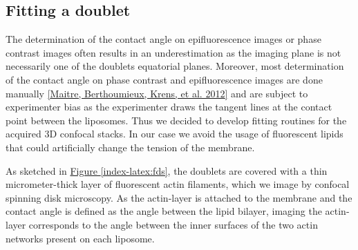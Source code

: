 \documentclass[A4paperpaper,11pt,english]{sphinxmanual}
\begin{document}
\subsection{Fitting a doublet}
\label{index-latex:fitting-a-doublet}
The determination of the contact angle on epifluorescence images or phase contrast
images often results in an underestimation as the imaging plane is not necessarily one of the doublets
equatorial planes. Moreover, most determination of the contact angle on phase
contrast and epifluorescence images are done manually {\hyperref[index-latex:maitre2012]{{[}Maitre, Berthoumieux, Krens,  et al.  2012{]}}} and
are subject to experimenter bias as the experimenter draws the tangent lines at the
contact point between the liposomes. Thus we decided to develop fitting routines for the acquired
3D confocal stacks. In our case we avoid the usage of
fluorescent lipids that could artificially change the tension of the membrane.

As sketched in \hyperref[index-latex:fds]{Figure  \ref*{index-latex:fds}}, the doublets are covered with a
thin micrometer-thick layer of fluorescent actin filaments, which we
image by confocal spinning disk microscopy. As the actin-layer is attached to the membrane
and the contact angle is defined as the angle between the lipid bilayer, imaging the actin-layer corresponds
to the angle between the inner surfaces of the two actin networks present on each liposome.
\end{document}
